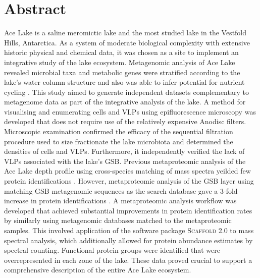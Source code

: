 \section{Abstract}
Ace Lake is a saline meromictic lake and the most studied lake in the Vestfold Hills, Antarctica.
As a system of moderate biological complexity with extensive historic physical and chemical data, it was chosen as a site to implement an integrative study of the lake ecosystem.
Metagenomic analysis of Ace Lake revealed microbial taxa and metabolic genes were stratified according to the lake's water column structure and also was able to infer potential for nutrient cycling \cite{Lauro2011}.
This study aimed to generate independent datasets complementary to metagenome data as part of the integrative analysis of the lake.
A method for visualising and enumerating cells and \acp{VLP} using epifluorescence microscopy was developed that does not require use of the relatively expensive Anodisc filters.
Microscopic examination confirmed the efficacy of the sequential filtration procedure used to size fractionate the lake microbiota and determined the densities of cells and \acp{VLP}. Furthermore, it independently verified the lack of \acp{VLP} associated with the lake's \ac{GSB}.
Previous metaproteomic analysis of the Ace Lake depth profile using cross-species matching of mass spectra yeilded few protein identifications \cite{Ng2010b}.
However, metaproteomic analysis of the \ac{GSB} layer using matching \ac{GSB} metagenomic sequences as the search database gave a 3-fold increase in protein identifications \cite{Ng2010a,Ng2010b}.
A metaproteomic analysis workflow was developed that achieved substantial improvements in protein identification rates by similarly using metagenomic databases matched to the metaproteomic samples.
This involved application of the software package \textsc{Scaffold} 2.0 to mass spectral analysis, which additionally allowed for protein abundance estimates by spectral counting.
Functional protein groups were identified that were overrepresented in each zone of the lake.
These data proved crucial to support a comprehensive description of the entire Ace Lake ecosystem. 

